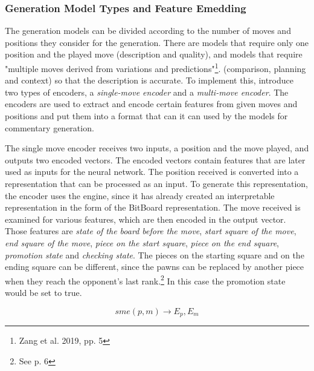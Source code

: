 \subsubsection{Generation Model Types and Feature Emedding}

The generation models can be divided according to the number of moves and positions they consider for the generation. There are models that require only one position and the played move (description and quality), and models that require "multiple moves derived from variations and predictions"\footnote{Zang et al. 2019, pp. 5}. (comparison, planning and context) so that the description is accurate. To implement this, \cite{zang-etal-2019-automated} introduce two types of encoders, a \textit{single-move encoder} and a \textit{multi-move encoder}. The encoders are used to extract and encode certain features from given moves and positions and put them into a format that can it can used by the models for commentary generation.

The single move encoder receives two inputs, a position and the move played, and outputs two encoded vectors. The encoded vectors contain features that are later used as inputs for the neural network. The position received is converted into a representation that can be processed as an input. To generate this representation, the encoder uses the engine, since it has already created an interpretable representation in the form of the BitBoard representation. The move received is examined for various features, which are then encoded in the output vector. Those features are \textit{state of the board before the move}, \textit{start square of the move}, \textit{end square of the move}, \textit{piece on the start square}, \textit{piece on the end square}, \textit{promotion state} and  \textit{checking state}. The pieces on the starting square and on the ending square can be different, since the pawns can be replaced by another piece when they reach the opponent's last rank.\footnote{See \cite{fide-2018-loc} p. 6} In this case the promotion state would be set to true.

$$
sme(p,m) \rightarrow E_p, E_m
$$